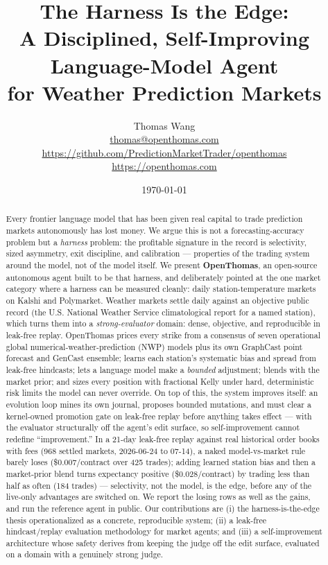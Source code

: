 \documentclass[10pt,twocolumn]{article}
\title{\textbf{The Harness Is the Edge:\\ A Disciplined, Self-Improving Language-Model Agent\\ for Weather Prediction Markets}}
\author{Thomas Wang\\ \small \href{mailto:thomas@openthomas.com}{thomas@openthomas.com}\\ \small \url{https://github.com/PredictionMarketTrader/openthomas} \quad\textbullet\quad \url{https://openthomas.com}}
\date{\today}
\begin{document}
\maketitle

\begin{abstract}
Every frontier language model that has been given real capital to trade
prediction markets autonomously has lost money. We argue this is not a
forecasting-accuracy problem but a \emph{harness} problem: the profitable
signature in the record is selectivity, sized asymmetry, exit discipline, and
calibration --- properties of the trading system around the model, not of the
model itself. We present \textbf{OpenThomas}, an open-source autonomous agent
built to be that harness, and deliberately pointed at the one market category
where a harness can be measured cleanly: daily station-temperature markets on
Kalshi and Polymarket. Weather markets settle daily against an objective public
record (the U.S. National Weather Service climatological report for a named
station), which turns them into a \emph{strong-evaluator} domain: dense,
objective, and reproducible in leak-free replay. OpenThomas prices every strike
from a consensus of seven operational global numerical-weather-prediction (NWP)
models plus its own GraphCast point forecast and GenCast ensemble; learns each
station's systematic bias and spread from leak-free hindcasts; lets a language
model make a \emph{bounded} adjustment; blends with the market prior; and sizes
every position with fractional Kelly under hard, deterministic risk limits the
model can never override. On top of this, the system improves itself: an
evolution loop mines its own journal, proposes bounded mutations, and must clear
a kernel-owned promotion gate on leak-free replay before anything takes effect
--- with the evaluator structurally off the agent's edit surface, so
self-improvement cannot redefine ``improvement.'' In a 21-day leak-free replay
against real historical order books with fees (968 settled markets, 2026-06-24 to
07-14), a naked model-vs-market rule barely loses (\$0.007/contract over 425
trades); adding learned station bias and then a market-prior blend turns
expectancy positive (\$0.028/contract) by trading less than half as often (184
trades) --- selectivity, not the model, is the edge, before any of the live-only
advantages are switched on. We report the losing rows as well as
the gains, and run the reference agent in public. Our contributions are (i) the
harness-is-the-edge thesis operationalized as a concrete, reproducible system;
(ii) a leak-free hindcast/replay evaluation methodology for market agents; and
(iii) a self-improvement architecture whose safety derives from keeping the
judge off the edit surface, evaluated on a domain with a genuinely strong judge.
\end{abstract}
\end{document}
